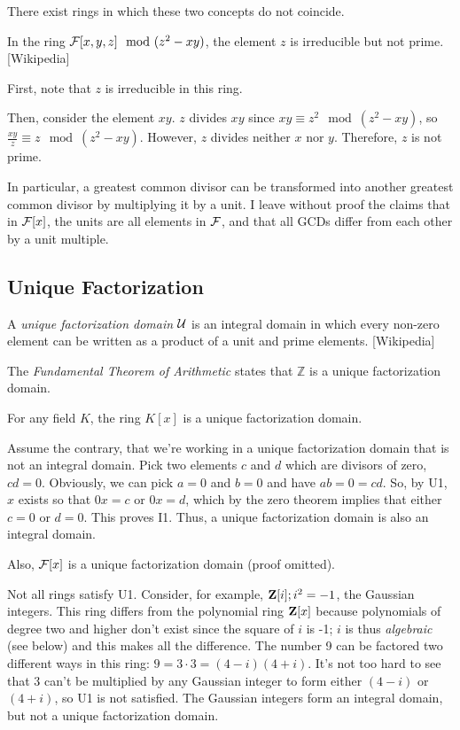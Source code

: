 There exist rings in which these two concepts do not coincide.

\example
In the ring ${\cal F}[x,y,z] \mod (z^2-xy)$, the element $z$ is
irreducible but not prime.  [Wikipedia]

First, note that $z$ is irreducible in this ring.

Then, consider the element $xy$.  $z$ divides $xy$ since
$xy \equiv z^2 \mod (z^2-xy)$, so $\frac{xy}{z} \equiv z \mod (z^2-xy)$.
However, $z$ divides neither $x$ nor $y$.
Therefore, $z$ is not prime.
\endexample



In particular, a greatest common divisor can be transformed into
another greatest common divisor by multiplying it by a unit.  I leave
without proof the claims that in ${\cal F}[x]$, the units are all
elements in ${\cal F}$, and that all GCDs differ from each other by a
unit multiple.

\subsection*{\qquad Unique Factorization}

\begin{key point}
A {\it unique factorization domain} ${\cal U}$
is an integral domain in which every non-zero element can be written as a product of a unit and prime elements.
[Wikipedia]
\end{key point}


The {\it Fundamental Theorem of Arithmetic} states that ${\mathbb Z}$
is a unique factorization domain.

\theorem

For any field $K$, the ring $K[x]$ is a unique factorization domain.

\proof

Assume the contrary, that we're working in a unique factorization
domain that is not an integral domain.  Pick two elements $c$ and $d$
which are divisors of zero, $cd=0$.  Obviously, we can pick $a=0$ and
$b=0$ and have $ab=0=cd$.  So, by U1, $x$ exists so that $0x=c$ or
$0x=d$, which by the zero theorem implies that either $c=0$ or $d=0$.
This proves I1.  Thus, a unique factorization domain is also an
integral domain.

\endtheorem

Also, ${\cal F}[x]$ is a unique
factorization domain (proof omitted).

Not all rings satisfy U1.  Consider, for example, ${\bf Z}[i];
i^2=-1$, the Gaussian integers.  This ring differs from the polynomial
ring ${\bf Z}[x]$ because polynomials of degree two and higher don't
exist since the square of $i$ is -1; $i$ is thus {\it algebraic} (see
below) and this makes all the difference.  The number 9 can be
factored two different ways in this ring: $9=3\cdot3=(4-i)(4+i)$.
It's not too hard to see that 3 can't be multiplied by any Gaussian
integer to form either $(4-i)$ or $(4+i)$, so U1 is not satisfied.
The Gaussian integers form an integral domain, but not a unique
factorization domain.


